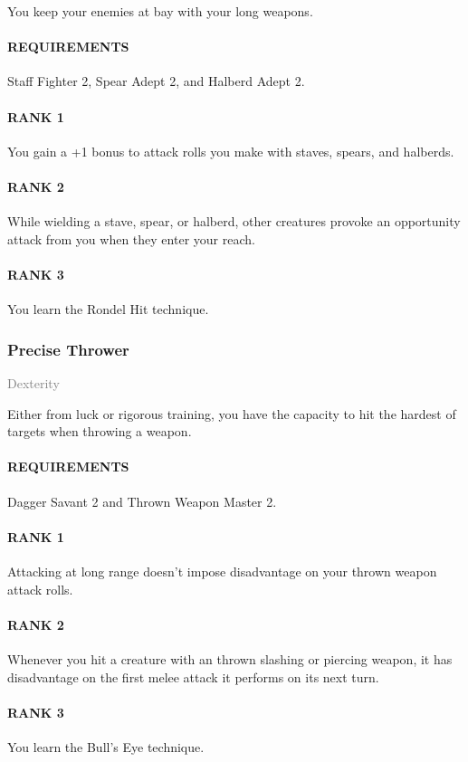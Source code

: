\normalsize
You keep your enemies at bay with your long weapons.
\paragraph{REQUIREMENTS} Staff Fighter 2, Spear Adept 2, and Halberd Adept 2.
\paragraph{RANK 1} You gain a +1 bonus to attack rolls you make with staves, spears, and halberds.
\paragraph{RANK 2} While wielding a stave, spear, or halberd, other creatures provoke an opportunity attack from you when they enter your reach.
\paragraph{RANK 3} You learn the Rondel Hit technique.

\subsubsection{Precise Thrower} \label{tal::precisethrower}
\small{\textcolor{gray}{Dexterity}}

\normalsize
Either from luck or rigorous training, you have the capacity to hit the hardest of targets when throwing a weapon.
\paragraph{REQUIREMENTS} Dagger Savant 2 and Thrown Weapon Master 2.
\paragraph{RANK 1} Attacking at long range doesn't impose disadvantage on your thrown weapon attack rolls.
\paragraph{RANK 2} Whenever you hit a creature with an thrown slashing or piercing weapon, it has disadvantage on the first melee attack it performs on its next turn.
\paragraph{RANK 3} You learn the Bull's Eye technique.

